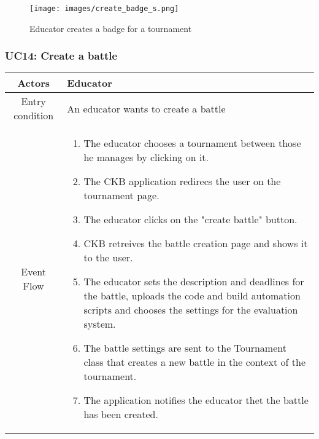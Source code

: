 \documentclass[a4paper, 11pt, titlepage]{article}
\begin{document}
\begin{figure}[h!]
    \centering
    \texttt{[image: images/create\_badge\_s.png]}
    \caption{Educator creates a badge for a tournament}
    \label{fig:seq_diag_create_badge}
    
\end{figure}

\clearpage

\subsubsection*{UC14: Create a battle}

\begin{center}
    \begin{tabularx}{\linewidth} {|c|X|}
        \hline 
        Actors & Educator\\
        \hline 
        Entry condition &
        An educator wants to create a battle\\
        \hline 
        Event Flow &
        \begin{enumerate}
            \item The educator chooses a tournament between those he manages by clicking on it.
            \item The CKB application redirecs the user on the tournament page.
            \item The educator clicks on the "create battle" button.
            \item CKB retreives the battle creation page and shows it to the user.
            \item The educator sets the description and deadlines for the battle, uploads the code and build automation scripts and chooses
            the settings for the evaluation system.
            \item The battle settings are sent to the Tournament class that creates a new battle in the context of the tournament.
            \item The application notifies the educator thet the battle has been created. 
        \end{enumerate}\\


\end{tabularx}
\end{center}
\end{document}

